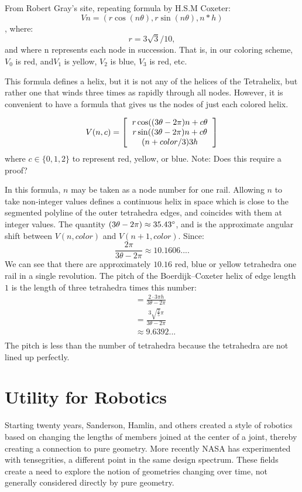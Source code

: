 \documentclass[11pt]{article}
\begin{document}
From Robert Gray's site, repeating formula by H.S.M Coxeter:
\[
Vn = (r \cos(n \theta), r \sin(n \theta), n*h)
\],
where:
\[
r = 3\sqrt{3} / 10, 
\]
and where n represents each node in succession. That is, in our coloring scheme, $V_0$ is red, and$ V_1$ is yellow,  $V_2$ is blue,
$V_3$ is red, etc. 

This formula defines a helix, but it is not any of the helices of the Tetrahelix, but rather one that winds three times
as rapidly through all nodes. However, it is convenient to have a formula that gives us the nodes of just
each colored helix.

\[
V(n,c) =
\left [
  \begin{tabular}{c}
   $ r  \cos((3 \theta - 2 \pi)n + c  \theta $\\
   $ r  \sin((3 \theta - 2 \pi)n + c  \theta $\\
   $ (n + color/3) 3  h $
  \end{tabular}
\right ]
\]
where $c \in \{0,1,2\}$ to represent red, yellow, or blue. Note: Does this require a proof?

In this formula, $n$ may be taken as a node number for one rail. Allowing $n$ to take non-integer values defines a continuous
helix in space which is close to the segmented polyline of the outer tetrahedra edges, and coincides with them at integer
values.
The quantity $ (3 \theta - 2 \pi) \approx 35.43 \degree $, and is the approximate angular shift between $V(n,color)$ and
$V(n+1,color)$.
Since:
\[ \frac{2 \pi}{3 \theta - 2 \pi} \approx 10.1606....
\]
We can see that there are approximately $10.16$ red, blue or yellow tetrahedra one rail in a single revolution.
The pitch of the Boerdijk--Coxeter helix of edge length $1$ is the length of three tetrahedra times this number:
\begin{align*}
  &= \frac{2 \cdot 3 \pi h}{3 \theta - 2\pi} \\
  &= \frac{3  \sqrt{\frac{2}{5}}  \pi}{3  \theta - 2 \pi} \\
  &\approx 9.6392... \\
\end{align*}
The pitch is less than the number of tetrahedra because the tetrahedra are not lined up perfectly.



\section{Utility for Robotics}

Starting twenty years, Sanderson, Hamlin, and others created a style of robotics based on changing the lengths of members
joined at the center of a joint, thereby creating a connection to pure geometry. More recently NASA has experimented with
tensegrities, a different point in the same design spectrum. These fields create a need to explore the notion of
geometries changing over time, not generally considered directly by pure geometry.
\end{document}
